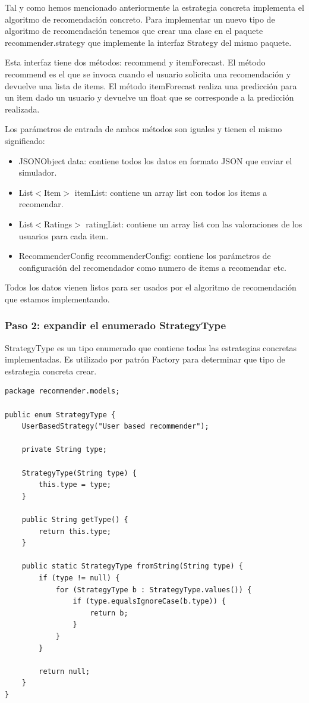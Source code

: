 Tal y como hemos mencionado anteriormente la estrategia concreta implementa el algoritmo de recomendación concreto. Para implementar un nuevo tipo de algoritmo de recomendación tenemos que crear una clase en el paquete recommender.strategy que implemente la interfaz Strategy del mismo paquete. 

Esta interfaz tiene dos métodos: recommend y itemForecast. El método recommend es el que se invoca cuando el usuario solicita una recomendación y devuelve una lista de items. El método itemForecast realiza una predicción para un item dado un usuario y devuelve un float que se corresponde a la predicción realizada.

Los parámetros de entrada de ambos métodos son iguales y tienen el mismo significado:

\begin{itemize}
	\item JSONObject data: contiene todos los datos en formato JSON que enviar el simulador.
	\item List$<$Item$>$ itemList: contiene un array list con todos los items a recomendar.
	\item List$<$Ratings$>$ ratingList: contiene un array list con las valoraciones de los usuarios para cada item.
	\item RecommenderConfig recommenderConfig: contiene los parámetros de configuración del recomendador como numero de items a recomendar etc.
\end{itemize}

Todos los datos vienen listos para ser usados por el algoritmo de recomendación que estamos implementando.

\newpage

\subsubsection{Paso 2: expandir el enumerado StrategyType}

StrategyType es un tipo enumerado que contiene todas las estrategias concretas implementadas. Es utilizado por patrón Factory para determinar que tipo de estrategia concreta crear. 

\begin{lstlisting}[language=xml, frame=single]
package recommender.models;

public enum StrategyType {
	UserBasedStrategy("User based recommender");
	
	private String type;
	
	StrategyType(String type) {
		this.type = type;  
	}
	
	public String getType() {
		return this.type;
	}

	public static StrategyType fromString(String type) {
		if (type != null) {
			for (StrategyType b : StrategyType.values()) {
				if (type.equalsIgnoreCase(b.type)) {
					return b;
				}
			}
		}
	
		return null;
	}
}
\end{lstlisting}

